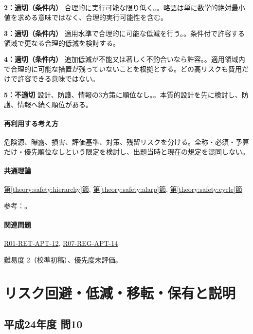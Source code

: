 \noindent\textbf{2：適切（条件内）} 合理的に実行可能な限り低く。。略語は単に数学的絶対最小値を求める意味ではなく、合理的実行可能性を含む。\par

\noindent\textbf{3：適切（条件内）} 適用水準で合理的に可能な低減を行う。。条件付で許容する領域で更なる合理的低減を検討する。\par

\noindent\textbf{4：適切（条件内）} 追加低減が不能又は著しく不釣合いなら許容。。適用領域内で合理的に可能な措置が残っていないことを根拠とする。どの高リスクも費用だけで許容できる意味ではない。\par

\noindent\textbf{5：不適切} 設計、防護、情報の3方策に順位なし。。本質的設計を先に検討し、防護、情報へ続く順位がある。\par

\paragraph{再利用する考え方} 危険源、曝露、損害、評価基準、対策、残留リスクを分ける。全称・必須・予算だけ・優先順位なしという限定を検討し、出題当時と現在の規定を混同しない。

\paragraph{共通理論} \hyperref[theory:safety:hierarchy]{第\ref*{theory:safety:hierarchy}節}, \hyperref[theory:safety:alarp]{第\ref*{theory:safety:alarp}節}, \hyperref[theory:safety:cycle]{第\ref*{theory:safety:cycle}節}

\par 参考：\cite{saf_ra2006,saf_parliament2006,saf_guide51}。

\paragraph{関連問題} \hyperref[q:r01-ret-apt-12]{R01-RET-APT-12}, \hyperref[q:r07-reg-apt-14]{R07-REG-APT-14}

\par 難易度 2（校準初稿）、優先度未評価。

\section{リスク回避・低減・移転・保有と説明}

\subsection{平成24年度 問10}
\label{q:h24-reg-apt-10}

